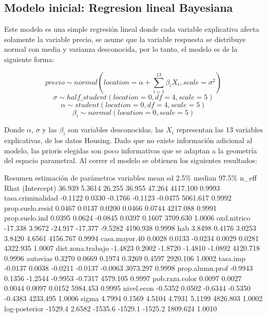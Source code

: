 \documentclass[nojss]{jss}
\begin{document}
\subsection{Modelo inicial: Regresion lineal Bayesiana} 
 
Este modelo es una simple regresión lineal donde cada variable explicativa afecta solamente la variable precio, se asume que la variable respuesta se distribuye normal con media y varianza desconocida, por lo tanto, el modelo es de la siguiente forma:

$$precio \sim normal(location = \alpha + \sum_{i=1}^{13}\beta_i X_i,scale =  \sigma^2)$$
$$\sigma \sim half\_student(location = 0,df = 4,scale = 5)$$ 
$$\alpha \sim student(location = 0,df = 4,scale = 5)$$ 
$$\beta_i \sim normal(location = 0,scale = 5)$$

Donde $\alpha$, $\sigma$ y las $\beta_i$ son variables desconocidas, las $X_i$ representan las 13 variables explicativas, de los datos Housing. Dado que no existe información adicional al modelo, las prioris elegidas son poco informativas que se adaptan a la geometría del espacio parametral. Al correr el modelo se obtienen los siguientes resultados:

\begin{CodeChunk}	
\begin{CodeOutput}
 		Resumen estimación de parámetros	
   variables        mean    sd    2.5\%   median   97.5\%   n_eff    Rhat
(Intercept)        36.939 5.3614  26.255  36.955  47.264  4117.100  0.9993
tasa.criminalidad -0.1122 0.0330 -0.1766 -0.1123 -0.0475  5061.617  0.9992
prop.suelo.resid   0.0467 0.0137  0.0200  0.0466  0.0744  4217.088  0.9991
prop.suelo.ind     0.0395 0.0624 -0.0845  0.0397  0.1607  3709.630  1.0006
oxd.nitrico       -17.338 3.9672 -24.917 -17.377 -9.5282  4190.938  0.9998
hab                3.8498 0.4176  3.0253  3.8420  4.6561  4156.767  0.9994
casa.mayor.40      0.0028 0.0133 -0.0234  0.0029  0.0281  4322.935  1.0007
dist.zona.trabajo -1.4823 0.2002 -1.8720 -1.4810 -1.0892  4120.718  0.9996
autovias           0.3270 0.0669  0.1974  0.3269  0.4597  2920.106  1.0002
tasa.imp          -0.0137 0.0038 -0.0211 -0.0137 -0.0063  3073.297  0.9998
prop.alumn.prof   -0.9943 0.1356 -1.2544 -0.9953 -0.7317  4579.105  0.9997
pob.raza.color     0.0097 0.0027  0.0044  0.0097  0.0152  5984.453  0.9995
nivel.econ        -0.5352 0.0502 -0.6344 -0.5350 -0.4383  4233.495  1.0006
sigma              4.7994 0.1569  4.5104  4.7931  5.1199  4826.803  1.0002
log-posterior     -1529.4 2.6582 -1535.6 -1529.1 -1525.2  1809.624  1.0010 
\end{CodeOutput}
\end{CodeChunk}
\end{document}
